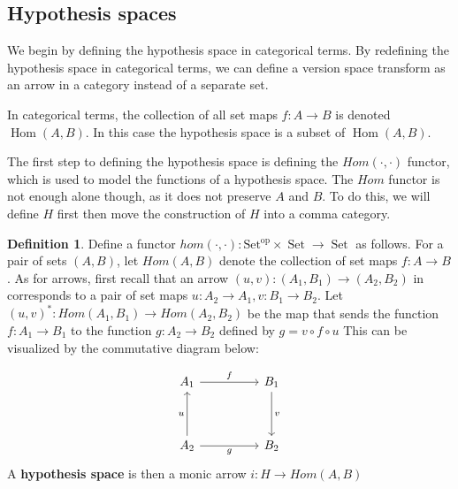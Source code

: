 \documentclass{article}
\theoremstyle{definition}
\newtheorem{definition}{Definition}[section]
\begin{document}
\subsection{Hypothesis spaces}
We begin by defining the hypothesis space in categorical terms. By redefining the hypothesis space in categorical terms, we can define a version space transform as an arrow in a category instead of a separate set. 

In categorical terms, the collection of all set maps $f: A \rightarrow B$ is denoted $\operatorname{Hom}(A,B)$. In this case the hypothesis space is a subset of $\operatorname{Hom}(A,B)$. 

The first step to defining the hypothesis space is defining the $Hom(\cdot, \cdot)$ functor, which is used to model the functions of a hypothesis space. The $Hom$ functor is not enough alone though, as it does not preserve $A$ and $B$. To do this, we will define $H$ first then move the construction of $H$ into a comma category.

\begin{definition}
Define a functor $hom(\cdot,\cdot): \operatorname{Set^{op}} \times \operatorname{Set} \rightarrow \operatorname{Set}$ as follows. For a pair of sets $(A,B)$, let $Hom(A,B)$ denote the collection of set maps $f:A\rightarrow B$. As for arrows, first recall that an arrow $(u,v):(A_1, B_1) \rightarrow (A_2, B_2)$ in corresponds to a pair of set maps $u: A_2 \rightarrow A_1, v:B_1\rightarrow B_2$. Let $(u,v)^*: Hom(A_1,B_1) \rightarrow Hom(A_2,B_2)$ be the map that sends the function $f:A_1\rightarrow B_1$ to the function $g: A_2 \rightarrow B_2$ defined by $g=v \circ f \circ u$ This can be visualized by the commutative diagram below: 

\[\begin{tikzcd}
	{A_1} && {B_1} \\
	\\
	{A_2} && {B_2}
	\arrow["f", from=1-1, to=1-3]
	\arrow["u", from=3-1, to=1-1]
	\arrow["g"', from=3-1, to=3-3]
	\arrow["v", from=1-3, to=3-3]
\end{tikzcd}\]
A \textbf{hypothesis space} is then a monic arrow $i:H\rightarrow Hom(A,B)$
\end{definition}
\end{document}
